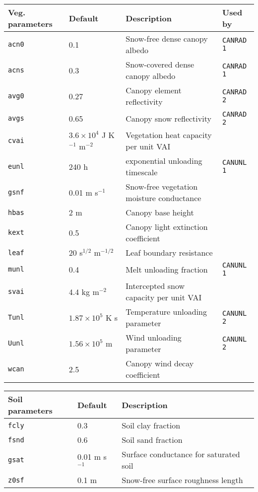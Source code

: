\documentclass{article}
\begin{document}
\begin{longtable}{|l|l|l|l|} \hline
Veg. parameters       & Default       & Description                               &  Used by       \\ \hline
{\tt acn0} & 0.1                      & Snow-free dense canopy albedo             & {\tt CANRAD 1} \\
{\tt acns} & 0.3                      & Snow-covered dense canopy albedo          & {\tt CANRAD 1} \\  
{\tt avg0} & 0.27                     & Canopy element reflectivity               & {\tt CANRAD 2} \\
{\tt avgs} & 0.65                     & Canopy snow reflectivity                  & {\tt CANRAD 2} \\  
{\tt cvai} & $3.6\times 10^4$ J K$^{-1}$ m$^{-2}$ & Vegetation heat capacity per unit VAI &        \\
{\tt eunl} & 240 h                    & exponential unloading timescale           & {\tt CANUNL 1} \\
{\tt gsnf} & 0.01 m s$^{-1}$          & Snow-free vegetation moisture conductance &                \\
{\tt hbas} & 2 m                      & Canopy base height                        &                \\
{\tt kext} & 0.5                      & Canopy light extinction coefficient       &                \\
{\tt leaf} & 20 s$^{1/2}$ m$^{-1/2}$  & Leaf boundary resistance                  &                \\
{\tt munl} & 0.4                      & Melt unloading fraction                   & {\tt CANUNL 1} \\
{\tt svai} & 4.4 kg m$^{-2}$          & Intercepted snow capacity per unit VAI    &                \\
{\tt Tunl} & $1.87\times 10^5$ K s    & Temperature unloading parameter           & {\tt CANUNL 2} \\
{\tt Uunl} & $1.56\times 10^5$ m      & Wind unloading parameter                  & {\tt CANUNL 2} \\
{\tt wcan} & 2.5                      & Canopy wind decay coefficient             & \\ \hline
\end{longtable}

\begin{longtable}{|l|l|l|} \hline
Soil parameters  & Default         & Description                             \\ \hline
{\tt fcly}       & 0.3             & Soil clay fraction                      \\
{\tt fsnd}       & 0.6             & Soil sand fraction                      \\
{\tt gsat}       & 0.01 m s$^{-1}$ & Surface conductance for saturated soil  \\
{\tt z0sf}       & 0.1 m           & Snow-free surface roughness length      \\ \hline 
\end{longtable}
\end{document}
